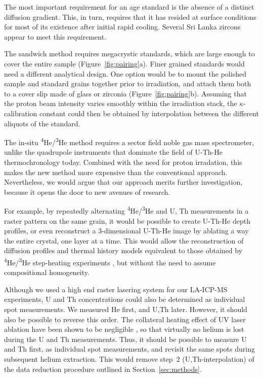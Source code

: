 \documentclass{article}
\begin{document}
The most important requirement for an age standard is the absence of a
distinct diffusion gradient. This, in turn, requires that it has
resided at surface conditions for most of its existence after initial
rapid cooling.  Several Sri Lanka zircons appear to meet this
requirement.\medskip

The sandwich method requires megacrystic standards, which are large
enough to cover the entire sample (Figure~\ref{fig:pairing}a). Finer
grained standards would need a different analytical design. One option
would be to mount the polished sample and standard grains together
prior to irradiation, and attach them both to a cover slip made of
glass or zirconia (Figure~\ref{fig:pairing}b). Assuming that the
proton beam intensity varies smoothly within the irradiation stack,
the $\kappa$-calibration constant could then be obtained by
interpolation between the different aliquots of the standard.\medskip

The in-situ \textsuperscript{4}He/\textsuperscript{3}He method
requires a sector field noble gas mass spectrometer, unlike the
quadrupole instruments that dominate the field of U-Th-He
thermochronology today. Combined with the need for proton irradation,
this makes the new method more expensive than the conventional
approach. Nevertheless, we would argue that our approach merits
further investigation, because it opens the door to new avenues of
research.\medskip

For example, by repeatedly alternating
\textsuperscript{4}He/\textsuperscript{3}He and U, Th measurements in
a raster pattern on the same grain, it would be possible to create
U-Th-He depth profiles, or even reconstruct a 3-dimensional U-Th-He
image by ablating a way the entire crystal, one layer at a time. This
would allow the reconstruction of diffusion profiles and thermal
history models equivalent to those obtained by
\textsuperscript{4}He/\textsuperscript{3}He step-heating experiments
\citep{tripathy2015}, but without the need to assume compositional
homogeneity.\medskip

Although we used a high end raster lasering system for our LA-ICP-MS
experiments, U and Th concentrations could also be determined as
individual spot measurements. We measured He first, and U,Th later.
However, it should also be possible to reverse this order.  The
collateral heating effect of UV laser ablation have been shown to be
negligible \citep[in apatite;][]{vansoest2011}, so that virtually no
helium is lost during the U and Th measurements. Thus, it should be
possible to measure U and Th first, as individual spot measurements,
and revisit the same spots during subsequent helium extraction. This
would remove step~2 (U,Th-interpolation) of the data reduction
procedure outlined in Section~\ref{sec:methods}.\medskip
\end{document}
